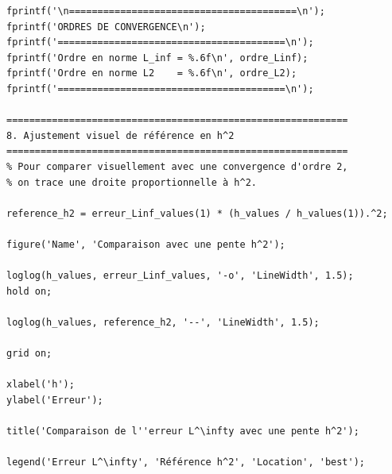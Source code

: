 \documentclass[12pt,a4paper]{article}
\begin{document}
\begin{lstlisting}[style=matlabstyle, caption={Code MATLAB utilisé pour la résolution numérique du problème de Poisson.}, label={code:matlab_poisson}]
fprintf('\n========================================\n');
fprintf('ORDRES DE CONVERGENCE\n');
fprintf('========================================\n');
fprintf('Ordre en norme L_inf = %.6f\n', ordre_Linf);
fprintf('Ordre en norme L2    = %.6f\n', ordre_L2);
fprintf('========================================\n');

============================================================
8. Ajustement visuel de référence en h^2
============================================================
% Pour comparer visuellement avec une convergence d'ordre 2,
% on trace une droite proportionnelle à h^2.

reference_h2 = erreur_Linf_values(1) * (h_values / h_values(1)).^2;

figure('Name', 'Comparaison avec une pente h^2');

loglog(h_values, erreur_Linf_values, '-o', 'LineWidth', 1.5);
hold on;

loglog(h_values, reference_h2, '--', 'LineWidth', 1.5);

grid on;

xlabel('h');
ylabel('Erreur');

title('Comparaison de l''erreur L^\infty avec une pente h^2');

legend('Erreur L^\infty', 'Référence h^2', 'Location', 'best');

\end{lstlisting}
\end{document}
